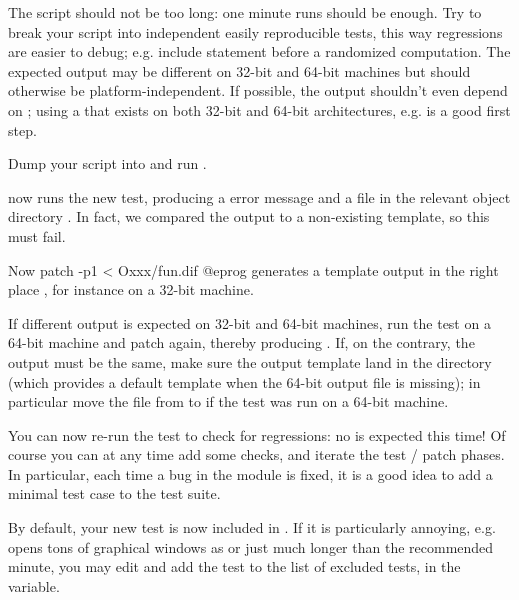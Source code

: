 \item The script should not be too long: one minute runs should be enough.
Try to break your script into independent easily reproducible tests, this way
regressions are easier to debug; e.g. include  statement before
a randomized computation. The expected output may be different on 32-bit and
64-bit machines but should otherwise be platform-independent. If possible, the
output shouldn't even depend on ; using a 
that exists on both 32-bit and 64-bit architectures, e.g.  is a
good first step.

\item Dump your script into  and run .

\item {} now runs the new test, producing a \kbd{[BUG]} error
message and a  file in the relevant object directory .
In fact, we compared the output to a non-existing template, so this must fail.

\item Now
\bprog
  patch -p1 < Oxxx/fun.dif
@eprog\noindent
generates a template output in the right place , for
instance on a 32-bit machine.

\item If different output is expected on 32-bit and 64-bit machines, run the
test on a 64-bit machine and patch again, thereby
producing . If, on the contrary, the output must be the
same, make sure the output template land in the  directory
(which provides a default template when the 64-bit output file is missing);
in particular move the file from  to 
if the test was run on a 64-bit machine.

\item You can now re-run the test to check for regressions: no \kbd{[BUG]}
is expected this time! Of course you can at any time add some checks, and
iterate the test / patch phases. In particular, each time a bug in the
 module is fixed, it is a good idea to add a minimal test case to
the test suite.

\item By default, your new test is now included in . If
it is particularly annoying, e.g. opens tons of graphical windows as
 or just much longer than the recommended minute, you
may edit  and add the  test to the list of
excluded tests, in the  variable.

